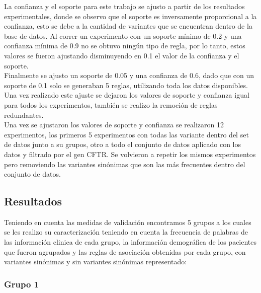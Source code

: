 La confianza y el soporte para este trabajo se ajusto a partir de los resultados experimentales, donde se observo que el soporte es inversamente proporcional a la confianza, esto se debe a la cantidad de variantes que se encuentran dentro de la base de datos. Al correr un experimento con un soporte mínimo de 0.2 y una confianza mínima de 0.9 no se obtuvo ningún tipo de regla, por lo tanto, estos valores se fueron ajustando disminuyendo en 0.1 el valor de la confianza y el soporte.\\

Finalmente se ajusto un soporte de 0.05 y una confianza de 0.6, dado que con un soporte de 0.1 solo se generaban 5 reglas, utilizando toda los datos disponibles. Una vez realizado este ajuste se dejaron los valores de soporte y confianza igual para todos los experimentos, también se realizo la remoción de reglas redundantes.\\

Una vez se ajustaron los valores de soporte y confianza se realizaron 12 experimentos, los primeros 5 experimentos con todas las variante dentro del set de datos junto a su grupos, otro a todo el conjunto de datos aplicado con los datos y filtrado por el gen CFTR. Se volvieron a repetir los mismos experimentos pero removiendo las variantes sinónimas que son las más frecuentes dentro del conjunto de datos.


\subsection{Resultados} 

Teniendo en cuenta las medidas de validación encontramos  5 grupos a los cuales se les realizo su caracterización teniendo en cuenta la frecuencia de palabras de las información clinica  de cada grupo, la información demográfica de los pacientes que fueron agrupados y las reglas de asociación obtenidas por cada grupo, con  variantes sinónimas y sin variantes sinónimas  representado: 

\subsubsection*{Grupo 1}

